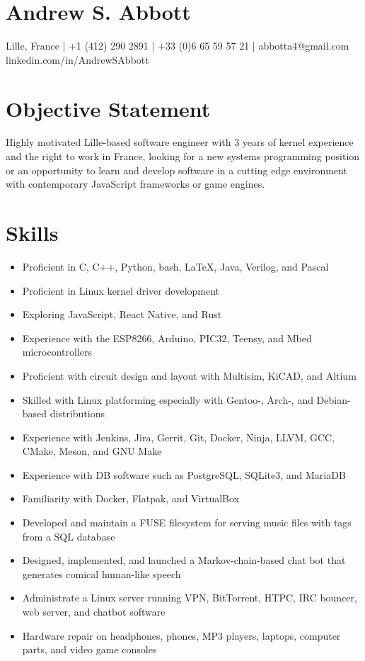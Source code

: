 \documentclass[letterpaper,10pt]{article}
\begin{document}
\pagestyle{empty}

\large\section{Andrew S. Abbott}
\normalsize
\begin{center}
  Lille, France |
  +1 (412) 290 2891 |
  +33 (0)6 65 59 57 21 |
  abbotta4@gmail.com\\
  linkedin.com/in/AndrewSAbbott\par
\end{center}

\section{Objective Statement}
Highly motivated Lille-based software engineer with 3 years of kernel experience and the right to work in France, looking for a new systems programming position or an opportunity to learn and develop software in a cutting edge environment with contemporary JavaScript frameworks or game engines.

\section{Skills}
\begin{itemize}
\item Proficient in C, C++, Python, bash, \LaTeX, Java, Verilog, and Pascal
\item Proficient in Linux kernel driver development
\item Exploring JavaScript, React Native, and Rust
\item Experience with the ESP8266, Arduino, PIC32, Teensy, and Mbed microcontrollers
\item Proficient with circuit design and layout with Multisim, KiCAD, and Altium
\item Skilled with Linux platforming especially with Gentoo-, Arch-, and Debian-based distributions
\item Experience with Jenkins, Jira, Gerrit, Git, Docker, Ninja, LLVM, GCC, CMake, Meson, and GNU Make
\item Experience with DB software such as PostgreSQL, SQLite3, and MariaDB
\item Familiarity with Docker, Flatpak, and VirtualBox
\item Developed and maintain a FUSE filesystem for serving music files with tags from a SQL database
\item Designed, implemented, and launched a Markov-chain-based chat bot that generates comical human-like speech
\item Administrate a Linux server running VPN, BitTorrent, HTPC, IRC bouncer, web server, and chatbot software
\item Hardware repair on headphones, phones, MP3 players, laptops, computer parts, and video game consoles
\end{itemize}
\end{document}
